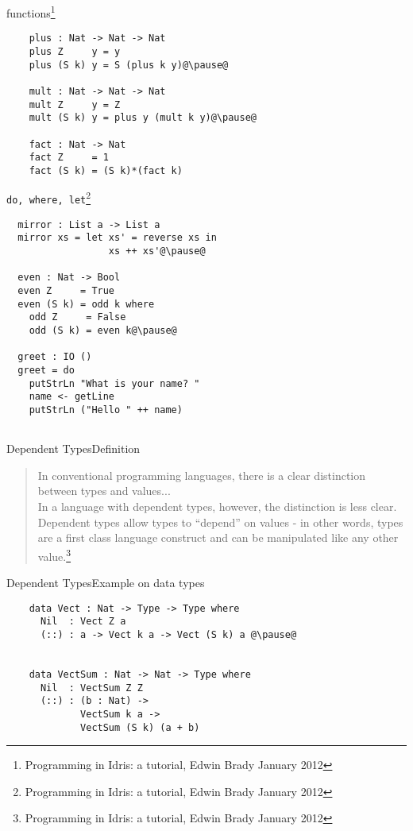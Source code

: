 \documentclass[handout]{beamer}
\begin{document}
\begin{frame}[fragile]{\idris}
  {functions\footnote[frame,1]
    {Programming in Idris: a tutorial, Edwin Brady January 2012}}
  \begin{lstlisting}
    plus : Nat -> Nat -> Nat
    plus Z     y = y
    plus (S k) y = S (plus k y)@\pause@

    mult : Nat -> Nat -> Nat
    mult Z     y = Z
    mult (S k) y = plus y (mult k y)@\pause@

    fact : Nat -> Nat
    fact Z     = 1
    fact (S k) = (S k)*(fact k)
  \end{lstlisting}
\end{frame}

\begin{frame}[fragile]{\idris}
  {\texttt{do, where, let}\footnote[frame,1]
    {Programming in Idris: a tutorial, Edwin Brady January 2012}}
\begin{lstlisting}
  mirror : List a -> List a
  mirror xs = let xs' = reverse xs in
                  xs ++ xs'@\pause@

  even : Nat -> Bool
  even Z     = True
  even (S k) = odd k where
    odd Z     = False
    odd (S k) = even k@\pause@

  greet : IO ()
  greet = do 
    putStrLn "What is your name? "
    name <- getLine
    putStrLn ("Hello " ++ name)


\end{lstlisting}
\end{frame}

\begin{frame}{Dependent Types}{Definition}
  \begin{quotation}
    In conventional programming languages, there is a clear
    distinction between types and values... \\
    In a language with dependent types, however, the distinction is
    less clear. Dependent types allow types to ``depend'' on values -
    in other words, types are a first class language construct and can
    be manipulated like any other value.\footnote[frame,1]
    {Programming in Idris: a tutorial, Edwin Brady January 2012}
  \end{quotation}
\end{frame}

\begin{frame}[fragile]{Dependent Types}{Example on data types}
  \begin{lstlisting}
    data Vect : Nat -> Type -> Type where
      Nil  : Vect Z a
      (::) : a -> Vect k a -> Vect (S k) a @\pause@


    data VectSum : Nat -> Nat -> Type where
      Nil  : VectSum Z Z
      (::) : (b : Nat) ->
             VectSum k a ->
             VectSum (S k) (a + b)
    \end{lstlisting}
\end{frame}
\end{document}
